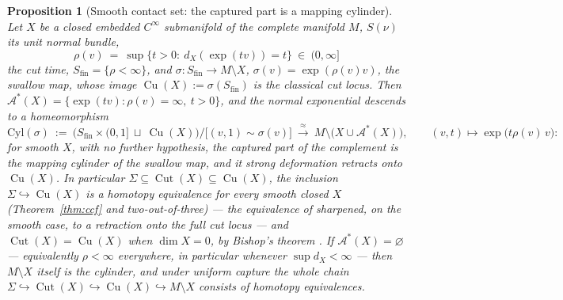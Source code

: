 \documentclass[11pt]{article}
\newtheorem{proposition}[theorem]{Proposition}
\theoremstyle{remark}
\newcommand{\X}{X}
\newcommand{\dX}{d_{\X}}
\newcommand{\Cut}{\operatorname{Cut}}
\newcommand{\Aub}{\mathcal{A}^{\ast}}
\newcommand{\Cu}{\operatorname{Cu}}
\begin{document}
\begin{proposition}[Smooth contact set: the captured part is a
mapping cylinder]\label{prop:thom}
Let $\X$ be a closed embedded $C^{\infty}$ submanifold of the
complete manifold $M$, $S(\nu)$ its unit normal bundle,
\[
  \rho(v)\ =\ \sup\{t>0:\ \dX(\exp(tv))=t\}\ \in\ (0,\infty]
\]
the cut time, $S_{\mathrm{fin}}=\{\rho<\infty\}$, and
$\sigma:S_{\mathrm{fin}}\to M\setminus\X$,
$\sigma(v)=\exp(\rho(v)v)$, the \emph{swallow map}, whose image
$\Cu(\X):=\sigma(S_{\mathrm{fin}})$ is the classical cut locus.
Then $\Aub(\X)=\{\exp(tv):\rho(v)=\infty,\ t>0\}$, and the normal
exponential descends to a homeomorphism
\[
  \mathrm{Cyl}(\sigma)\ :=\ \bigl(S_{\mathrm{fin}}\times(0,1]\
  \sqcup\ \Cu(\X)\bigr)\big/\bigl[(v,1)\sim\sigma(v)\bigr]
  \ \xrightarrow{\ \approx\ }\
  M\setminus\bigl(\X\cup\Aub(\X)\bigr),
  \qquad (v,t)\mapsto\exp\bigl(t\rho(v)\,v\bigr) :
\]
for smooth $\X$, with no further hypothesis, \emph{the captured
part of the complement is the mapping cylinder of the swallow
map}, and it strong deformation retracts onto $\Cu(\X)$. In
particular $\Sigma\subseteq\Cut(\X)\subseteq\Cu(\X)$, the
inclusion $\Sigma\hookrightarrow\Cu(\X)$ is a homotopy equivalence
for every smooth closed $\X$ (Theorem~\ref{thm:ccf} and
two-out-of-three) --- the equivalence of \cite{CCF} sharpened, on
the smooth case, to a retraction onto the full cut locus ---
and $\Cut(\X)=\Cu(\X)$ when $\dim\X=0$, by Bishop's theorem
\cite{Bis}. If $\Aub(\X)=\varnothing$ --- equivalently
$\rho<\infty$ everywhere, in particular whenever $\sup\dX<\infty$
--- then $M\setminus\X$ itself is the cylinder, and under uniform
capture the whole chain
$\Sigma\hookrightarrow\Cut(\X)\hookrightarrow\Cu(\X)
\hookrightarrow M\setminus\X$ consists of homotopy equivalences.
\end{proposition}
\end{document}
